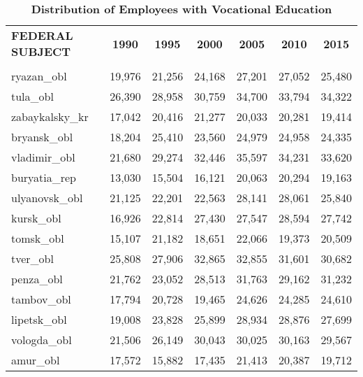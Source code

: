 \documentclass[alpha-refs,fleqn]{wiley-article_p2}
\begin{document}
\setcounter{table}{1} 
\renewcommand{\thetable}{A\arabic{table}}
\smaller
\begin{table}[h]
\caption{\textbf{Distribution of Employees with Vocational Education}}\label{table:a1}
\begin{threeparttable}
\setlength{\tabcolsep}{5pt}
\renewcommand{\arraystretch}{1.25}
\begin{tabular}{p{5.5cm}cccccc}
\rowcolor{grey!30} 
\textbf{FEDERAL SUBJECT}	&	\textbf{1990}	&	\textbf{1995}	&	\textbf{2000}	&	\textbf{2005}	&	\textbf{2010}	&	\textbf{2015} 	\\
 	&	\hspace{4em}	&	\hspace{4em}	&	\hspace{4em}	&	\hspace{4em} &	\hspace{4em} &	\hspace{4em}	\\
ryazan\_obl	&	19,976	&	21,256	&	24,168	&	27,201	&	27,052	&	25,480	\\
tula\_obl	&	26,390	&	28,958	&	30,759	&	34,700	&	33,794	&	34,322	\\
zabaykalsky\_kr	&	17,042	&	20,416	&	21,277	&	20,033	&	20,281	&	19,414	\\
bryansk\_obl	&	18,204	&	25,410	&	23,560	&	24,979	&	24,958	&	24,335	\\
vladimir\_obl	&	21,680	&	29,274	&	32,446	&	35,597	&	34,231	&	33,620	\\
buryatia\_rep	&	13,030	&	15,504	&	16,121	&	20,063	&	20,294	&	19,163	\\
ulyanovsk\_obl	&	21,125	&	22,201	&	22,563	&	28,141	&	28,061	&	25,840	\\
kursk\_obl	&	16,926	&	22,814	&	27,430	&	27,547	&	28,594	&	27,742	\\
tomsk\_obl	&	15,107	&	21,182	&	18,651	&	22,066	&	19,373	&	20,509	\\
tver\_obl	&	25,808	&	27,906	&	32,865	&	32,855	&	31,601	&	30,682	\\
penza\_obl	&	21,762	&	23,052	&	28,513	&	31,763	&	29,162	&	31,232	\\
tambov\_obl	&	17,794	&	20,728	&	19,465	&	24,626	&	24,285	&	24,610	\\
lipetsk\_obl	&	19,008	&	23,828	&	25,899	&	28,934	&	28,876	&	27,699	\\
vologda\_obl	&	21,506	&	26,149	&	30,043	&	30,025	&	30,163	&	29,567	\\
amur\_obl	&	17,572	&	15,882	&	17,435	&	21,413	&	20,387	&	19,712	\\

\end{tabular}
\end{threeparttable}
\end{table}
\end{document}
